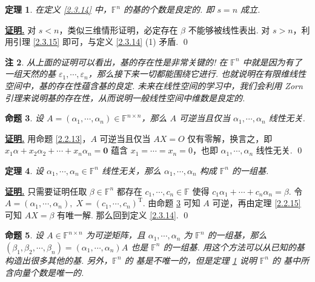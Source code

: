 \documentclass[10pt,openany]{article}
\theoremstyle{thmstyle} %
\newtheorem{theorem}{定理}[subsection]
\theoremstyle{defstyle} %
\theoremstyle{prostyle} %
\newtheorem{proposition}[theorem]{命题}
\theoremstyle{exastyle}
\theoremstyle{remstyle}
\newtheorem{remark}[theorem]{注}
\renewenvironment{proof}[1][证明]{\par\underline{\textbf{#1.}} \;\fangsong}{\qed\par}
\newcommand{\T}{^{\text{T}}}
\newcommand{\F}{\mathbb{F}}
\newcommand{\n}{^{n \times n}}
\begin{document}
\begin{theorem}\label{2.3.16}
	在定义 \ref{2.3.14} 中，\( \F^n \) 的基的个数是良定的. 即 \( s=n \) 成立.
\end{theorem}

\begin{proof}
	对 \( s<n \)，类似三维情形证明，必定存在 \( \beta \) 不能够被线性表出. 对 \( s>n \)，利用引理 \ref{2.3.15} 即可，与定义 \ref{2.3.14} (1) 矛盾.
\end{proof}

\begin{remark}
	从上面的证明可以看出，基的存在性是非常关键的! 在 \( \F^n \) 中就是因为有了一组天然的基 \( \varepsilon_1,\cdots,\varepsilon_n \)，那么接下来一切都能围绕它进行. 也就说明在有限维线性空间中，基的存在性蕴含基的良定. 未来在线性空间的学习中，我们会利用 Zorn 引理来说明基的存在性，从而说明一般线性空间中维数是良定的.
\end{remark}

\begin{proposition} \label{2.3.18}
	设 \( A=(\alpha_1,\cdots,\alpha_n) \in \F^{n \times n} \)，那么 \( A \) 可逆当且仅当 \( \alpha_1,\cdots,\alpha_n \) 线性无关. 
\end{proposition}

\begin{proof}
	用命题 \ref{2.2.13}，\( A \) 可逆当且仅当 \( AX=O \) 仅有零解，换言之，即 \( x_1\alpha+x_2\alpha_2+\cdots+x_n\alpha_n=\bm{0} \) 蕴含 \( x_1=\cdots=x_n=0 \)，也即 \( \alpha_1,\cdots,\alpha_n \) 线性无关. 
\end{proof}

\begin{theorem} \label{2.3.19}
	设 \( \alpha_1,\cdots,\alpha_n \in \F^n \) 线性无关，那么 \( \alpha_1,\cdots,\alpha_n \) 构成 \( \F^n \) 的一组基. 
\end{theorem}

\begin{proof}
	只需要证明任取 \( \beta \in \F^n \) 都存在 \( c_1,\cdots,c_n \in \F \) 使得 \( c_1\alpha_1+\cdots+c_n\alpha_n=\beta \). 令 \( A=(\alpha_1,\cdots,\alpha_n), \; X=(c_1,\cdots,c_n)\T \). 由命题 \ref{2.3.18} 可知 \( A \) 可逆，再由定理 \ref{2.2.15} 可知 \( AX=\beta \) 有唯一解. 那么回到定义 \ref{2.3.14}.
\end{proof}

\begin{proposition} \label{2.3.20}
	设 \( A \in \F\n \) 为可逆矩阵，且 \( \alpha_1,\cdots,\alpha_n \) 为 \( \F^n \) 的一组基，那么 \( (\beta_1,\beta_2,\cdots,\beta_n)=(\alpha_1,\cdots,\alpha_n)A \) 也是  \( \F^n \) 的一组基. 用这个方法可以从已知的基构造出很多其他的基. 另外，\( \F^n \) 的 基是不唯一的，但是定理 \ref{2.3.16} 说明 \( \F^n \) 的 基中所含向量个数是唯一的.
\end{proposition}
\end{document}
